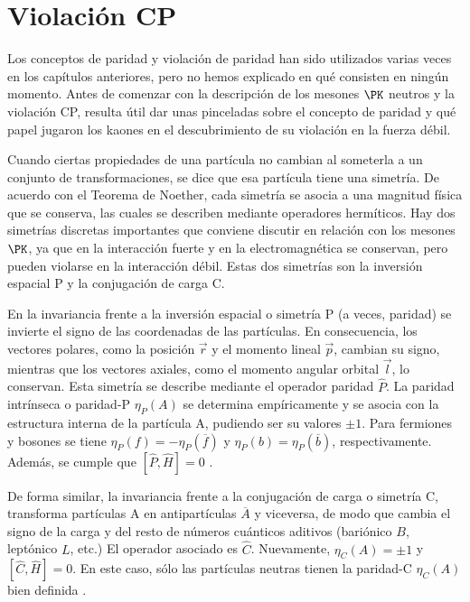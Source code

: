 \chapter{Violación CP}\label{cap:CP_violation}
Los conceptos de paridad y violación de paridad han sido utilizados varias veces en los capítulos anteriores, pero no hemos explicado en qué consisten en ningún momento. Antes de comenzar con la descripción de los mesones $\PK$ neutros y la violación CP, resulta útil dar unas pinceladas sobre el concepto de paridad y qué papel jugaron los kaones en el descubrimiento de su violación en la fuerza débil. 

Cuando ciertas propiedades de una partícula no cambian al someterla a un conjunto de transformaciones, se dice que esa partícula tiene una simetría. De acuerdo con el Teorema de Noether, cada simetría se asocia a una magnitud física que se conserva, las cuales se describen mediante operadores hermíticos. Hay dos simetrías discretas importantes que conviene discutir en relación con los mesones $\PK$, ya que en la interacción fuerte y en la
electromagnética se conservan, pero pueden violarse en la interacción débil. Estas dos simetrías son la inversión espacial P y la conjugación de carga C.

En la invariancia frente a la inversión espacial o simetría P (a veces, paridad) se invierte el signo de las coordenadas de las partículas. En consecuencia, los vectores polares, como la posición $\vec{r}$ y el momento lineal $\vec{p}$, cambian su signo, mientras que los vectores axiales, como el momento angular orbital $\vec{l}$, lo conservan. Esta simetría se describe mediante el operador paridad $\hat{P}$. La paridad intrínseca o paridad-P $\eta _{P}\left(A \right)$ se determina empíricamente y se asocia con la estructura interna de la partícula A, pudiendo ser su valores $\pm 1$. Para fermiones y bosones se tiene $\eta _{P}\left(f \right)= -\eta_{P} \left(\overline{f} \right)$ y $\eta_{P}\left(b \right)=\eta_{P}\left(\overline{b}\right)$, respectivamente. Además, se cumple que $[\hat{P}, \widehat{H}]=0$ \cite{notas2020}. 

De forma similar, la invariancia frente a la conjugación de carga o simetría C, transforma partículas A en antipartículas $\overline{A}$ y viceversa, de modo que cambia el signo de la carga y del resto de números cuánticos aditivos (bariónico $B$, leptónico $L$, etc.) El operador asociado es $\hat{C}$. Nuevamente, $\eta _{C}\left(A\right)= \pm 1$ y $[\hat{C} , \widehat{H}]=0$. En este caso, sólo las partículas neutras tienen la paridad-C  $\eta _{C}\left(A \right)$ bien definida \cite{notas2020}. 

